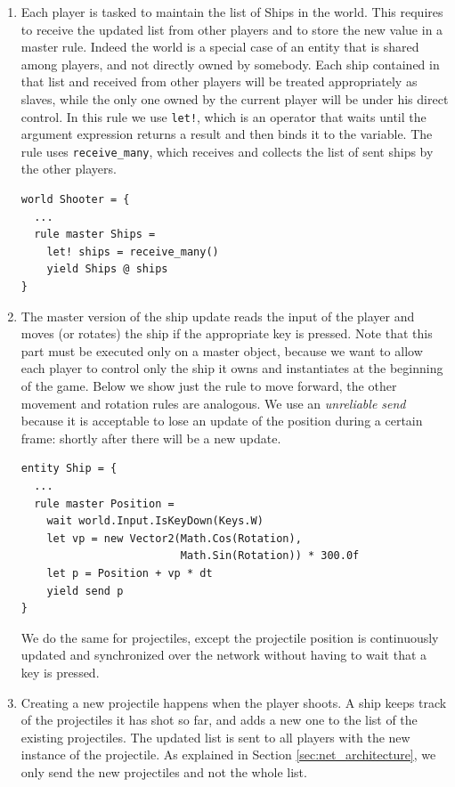 \begin{enumerate}
	\item Each player is tasked to maintain the list of Ships in the world. This requires to receive the updated list from other players and to store the new value in a master rule. Indeed the world is a special case of an entity that is shared among players, and not directly owned by somebody. Each ship contained in that list and received from other players will be treated appropriately as slaves, while the only one owned by the current player will be under his direct control. In this rule we use \texttt{let!}, which is an operator that waits until the argument expression returns a result and then binds it to the variable. The rule uses \texttt{receive\_many}, which receives and collects the list of sent ships by the other players.
	
	\begin{lstlisting}
world Shooter = {
  ...
  rule master Ships =
    let! ships = receive_many()
    yield Ships @ ships
}
	\end{lstlisting}
	
	\item The master version of the ship update reads the input of the player and moves (or rotates) the ship if the appropriate key is pressed. Note that this part must be executed only on a master object, because we want to allow each player to control only the ship it owns and instantiates at the beginning of the game. Below we show just the rule to move forward, the other movement and rotation rules are analogous. We use an \textit{unreliable send} because it is acceptable to lose an update of the position during a certain frame: shortly after there will be a new update.
	
	\begin{lstlisting}
entity Ship = {
  ...
  rule master Position =
    wait world.Input.IsKeyDown(Keys.W)
    let vp = new Vector2(Math.Cos(Rotation), 
                         Math.Sin(Rotation)) * 300.0f
    let p = Position + vp * dt
    yield send p
}
	\end{lstlisting}
	
	We do the same for projectiles, except the projectile position is continuously updated and synchronized over the network without having to wait that a key is pressed.
	
	\item Creating a new projectile happens when the player shoots. A ship keeps track of the projectiles it has shot so far, and adds a new one to the list of the existing projectiles. The updated list is sent to all players with the new instance of the projectile. As explained in Section \ref{sec:net_architecture}, we only send the new projectiles and not the whole list.
	

\end{enumerate}
